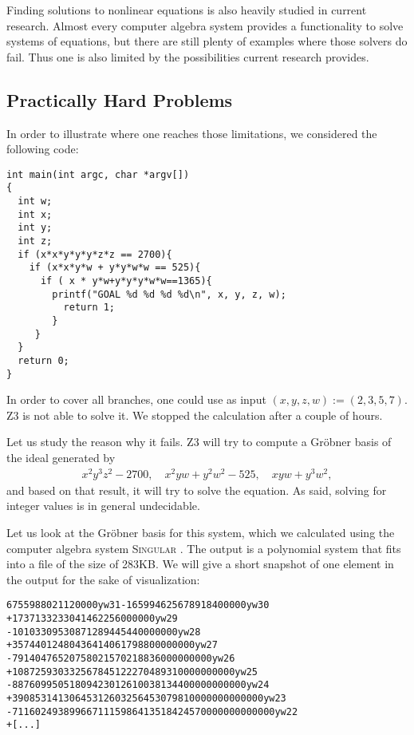 \documentclass[oribibl]{llncs}
\begin{document}
Finding solutions to nonlinear equations is also heavily studied in current
research. Almost every computer algebra system provides a
functionality to solve systems of equations, but there are still
plenty of examples where those solvers do fail. Thus one is also
limited by the possibilities current research provides.

\subsection{Practically Hard Problems}

In order to illustrate where one reaches those limitations, we
considered the following code:

\begin{verbatim}
int main(int argc, char *argv[])
{
  int w;
  int x;
  int y;
  int z;
  if (x*x*y*y*y*z*z == 2700){
    if (x*x*y*w + y*y*w*w == 525){
      if ( x * y*w+y*y*y*w*w==1365){
        printf("GOAL %d %d %d %d\n", x, y, z, w);
          return 1;
        }
     }
  }
  return 0;
}
\end{verbatim}

In order to cover all branches, one could use as input $(x,y,z,w) :=
(2,3,5,7)$. \textsc{Z3} is not able to solve it. We stopped the
calculation after a couple of hours.

Let us study the reason why it fails. \textsc{Z3} will try to compute
a Gr\"obner basis of the ideal generated by
\begin{eqnarray*}
  x^2y^3z^2 - 2700, \quad x^2yw + y^2w^2 - 525, \quad xyw + y^3w^2,
\end{eqnarray*}
and based on that result, it will try to solve the equation. As said,
solving for integer values is in general undecidable.

Let us look at the Gr\"obner basis for this system, which we
calculated using the computer algebra system \textsc{Singular}
\cite{Singular:2012}. The output is a polynomial system that fits into
a file of the size of 283KB. We will give a short snapshot of one
element in the output for the sake of visualization:

\begin{verbatim}
6755988021120000yw31-165994625678918400000yw30
+1737133233041462256000000yw29
-10103309530871289445440000000yw28
+35744012480436414061798800000000yw27
-79140476520758021570218836000000000yw26
+108725930332567845122270489310000000000yw25
-88760995051809423012610038134400000000000yw24
+39085314130645312603256453079810000000000000yw23
-7116024938996671115986413518424570000000000000yw22
+[...]
\end{verbatim}
\end{document}
